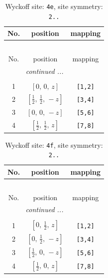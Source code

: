 \documentclass[fleqn,8pt]{jsarticle}
\begin{document}
\begin{longtable}{ccc}
\caption{Wyckoff site: {\tt 4e}, site symmetry: {\tt 2..}}
 \\
 \hline \hline
No. & position & mapping \\ \hline \endfirsthead

\multicolumn{2}{l}{\tablename\ \thetable{}} \\
 \hline \hline
No. & position & mapping \\ \hline \endhead

 \hline \hline
\multicolumn{2}{r}{\footnotesize\it continued ...} \\ \endfoot

 \hline \hline
\multicolumn{2}{r}{} \\ \endlastfoot

1 & $\left[ 0,\, 0,\, z \right]$ & {\tt [1,2]} \\ \hline
2 & $\left[ \frac{1}{2},\, \frac{1}{2},\, - z \right]$ & {\tt [3,4]} \\ \hline
3 & $\left[ 0,\, 0,\, - z \right]$ & {\tt [5,6]} \\ \hline
4 & $\left[ \frac{1}{2},\, \frac{1}{2},\, z \right]$ & {\tt [7,8]} \\
\end{longtable}
\renewcommand{\arraystretch}{1.2}
\begin{longtable}{ccc}
\caption{Wyckoff site: {\tt 4f}, site symmetry: {\tt 2..}}
 \\
 \hline \hline
No. & position & mapping \\ \hline \endfirsthead

\multicolumn{2}{l}{\tablename\ \thetable{}} \\
 \hline \hline
No. & position & mapping \\ \hline \endhead

 \hline \hline
\multicolumn{2}{r}{\footnotesize\it continued ...} \\ \endfoot

 \hline \hline
\multicolumn{2}{r}{} \\ \endlastfoot

1 & $\left[ 0,\, \frac{1}{2},\, z \right]$ & {\tt [1,2]} \\ \hline
2 & $\left[ 0,\, \frac{1}{2},\, - z \right]$ & {\tt [3,4]} \\ \hline
3 & $\left[ \frac{1}{2},\, 0,\, - z \right]$ & {\tt [5,6]} \\ \hline
4 & $\left[ \frac{1}{2},\, 0,\, z \right]$ & {\tt [7,8]} \\
\end{longtable}
\end{document}
